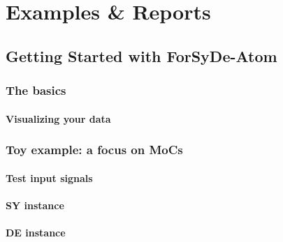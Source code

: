 \documentclass{book}
\newcommand*{\RootPath}{../../}%
\begin{document}
\part{Examples \& Reports}
\label{part:introduction}

\begin{refsection}
\chapter{Getting Started with {{\sc ForSyDe-Atom}}}
\label{ch:getting-started}
\renewcommand*{\RootPath}{../../getting-started/docs/latex}%
\graphicspath{{../../getting-started/docs/latex/figs/}}

\begin{summary}
  
\end{summary}
\minitoc



\section{The basics}
\label{sec:basic-usage}


\subsection{Visualizing your data}
\label{sec:visu-your-data}


\section{Toy example: a focus on MoCs}
\label{sec:toy-example}


\subsection{Test input signals}
\label{sec:test-signals}


\subsection{SY instance}
\label{sec:sy-instance}


\subsection{DE instance}
\label{sec:de-instance}



\end{refsection}
\end{document}
